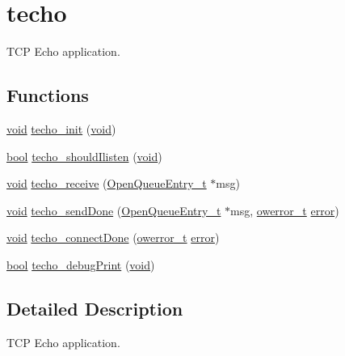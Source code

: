 \hypertarget{group__techo}{}\section{techo}
\label{group__techo}


T\+CP Echo application.  


\subsection*{Functions}
\begin{DoxyCompactItemize}
\item 
\hyperlink{usb__devapi_8h_afabf60e7f57651d6d595a02c75f07cd0}{void} \hyperlink{group__techo_ga7c68e1212de4939bceffd5329feafff1}{techo\+\_\+init} (\hyperlink{usb__devapi_8h_afabf60e7f57651d6d595a02c75f07cd0}{void})
\item 
\hyperlink{_p_e___types_8h_a97a80ca1602ebf2303258971a2c938e2}{bool} \hyperlink{group__techo_ga616f0dcaca44162d6a8b0466891cf11e}{techo\+\_\+should\+Ilisten} (\hyperlink{usb__devapi_8h_afabf60e7f57651d6d595a02c75f07cd0}{void})
\item 
\hyperlink{usb__devapi_8h_afabf60e7f57651d6d595a02c75f07cd0}{void} \hyperlink{group__techo_gaf2a0d94dcc4f719d7eeb11d67412e6ad}{techo\+\_\+receive} (\hyperlink{struct_open_queue_entry__t}{Open\+Queue\+Entry\+\_\+t} $\ast$msg)
\item 
\hyperlink{usb__devapi_8h_afabf60e7f57651d6d595a02c75f07cd0}{void} \hyperlink{group__techo_ga77920a19728f549824d72b79c61cf664}{techo\+\_\+send\+Done} (\hyperlink{struct_open_queue_entry__t}{Open\+Queue\+Entry\+\_\+t} $\ast$msg, \hyperlink{opendefs_8h_af20b7c3ed9d2ba19e56a309ad9314803}{owerror\+\_\+t} \hyperlink{disk_8c_ad018a3100b2dabad325a0800152db297}{error})
\item 
\hyperlink{usb__devapi_8h_afabf60e7f57651d6d595a02c75f07cd0}{void} \hyperlink{group__techo_gaab62fefb0961cacf5d0245ef48494666}{techo\+\_\+connect\+Done} (\hyperlink{opendefs_8h_af20b7c3ed9d2ba19e56a309ad9314803}{owerror\+\_\+t} \hyperlink{disk_8c_ad018a3100b2dabad325a0800152db297}{error})
\item 
\hyperlink{_p_e___types_8h_a97a80ca1602ebf2303258971a2c938e2}{bool} \hyperlink{group__techo_ga58193890ff1d925fe56100a8ba7fa3c8}{techo\+\_\+debug\+Print} (\hyperlink{usb__devapi_8h_afabf60e7f57651d6d595a02c75f07cd0}{void})
\end{DoxyCompactItemize}


\subsection{Detailed Description}
T\+CP Echo application. 

